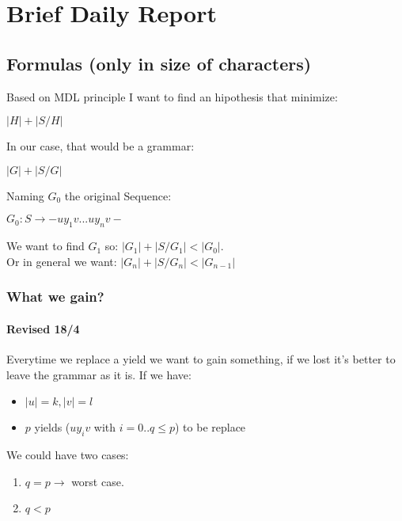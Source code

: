 
\chapter{Brief Daily Report}

\section{Formulas (only in size of characters)}

Based on MDL principle I want to find an hipothesis that minimize:
\begin{center}
$|H| + |S/H|$
\end{center} 

In our case, that would be a grammar:
\begin{center}
$|G| + |S/G|$
\end{center} 


Naming $G_{0}$ the original Sequence:
\begin{center}
 $G_{0}: S \rightarrow -uy_{1}v ... uy_{n}v-$
\end{center}

We want to find $G_{1}$ so: $|G_{1}|+|S/G_{1}|<|G_{0}|$.\\

Or in general we want: $|G_{n}|+|S/G_{n}|<|G_{n-1}|$ 


\subsection{What we gain?}

\subsubsection{Revised 18/4}

Everytime we replace a yield we want to gain something, if we lost it's better to leave the grammar as it is.
If we have:
\begin{itemize}
	\item $|u| = k, |v| = l$
	\item $p$ yields ($uy_iv$ with $i=0..q \leq p$) to be replace
\end{itemize}

We could have two cases:
\begin{enumerate}
	\item $q=p \rightarrow$ worst case.
	\item $q<p$	
\end{enumerate}

